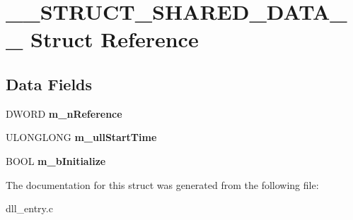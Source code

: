 \section{\+\_\+\+\_\+\+S\+T\+R\+U\+C\+T\+\_\+\+S\+H\+A\+R\+E\+D\+\_\+\+D\+A\+T\+A\+\_\+\+\_\+ Struct Reference}
\label{struct____STRUCT__SHARED__DATA____}
\subsection*{Data Fields}
\begin{DoxyCompactItemize}
\item 
\mbox{\label{struct____STRUCT__SHARED__DATA_____a20b19793ae26908a2ed1404ce6915c4c}} 
D\+W\+O\+RD {\bfseries m\+\_\+n\+Reference}
\item 
\mbox{\label{struct____STRUCT__SHARED__DATA_____a9cfe8385553ca3c3e1408670c00472e6}} 
U\+L\+O\+N\+G\+L\+O\+NG {\bfseries m\+\_\+ull\+Start\+Time}
\item 
\mbox{\label{struct____STRUCT__SHARED__DATA_____a20f1197589e6e8f9d7012744cb3acc16}} 
B\+O\+OL {\bfseries m\+\_\+b\+Initialize}
\end{DoxyCompactItemize}


The documentation for this struct was generated from the following file\+:\begin{DoxyCompactItemize}
\item 
dll\+\_\+entry.\+c\end{DoxyCompactItemize}
